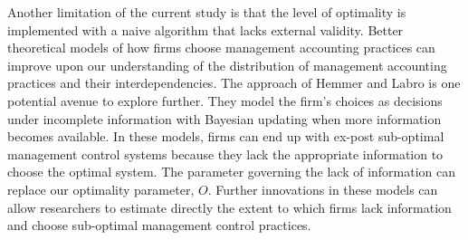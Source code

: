 \documentclass[12pt]{article}
\begin{document}
Another limitation of the current study is that the level of optimality is implemented with a naive algorithm that lacks external validity. Better theoretical models of how firms choose management accounting practices can improve upon our understanding of the distribution of management accounting practices and their interdependencies. The approach of Hemmer and Labro \citeyearpar{hemmer_management_2019} is one potential avenue to explore further. They model the firm's choices as decisions under incomplete information with Bayesian updating when more information becomes available. In these models, firms can end up with ex-post sub-optimal management control systems because they lack the appropriate information to choose the optimal system. The parameter governing the lack of information can replace our optimality parameter, \(O\). Further innovations in these models can allow researchers to estimate directly the extent to which firms lack information and choose sub-optimal management control practices.

\pagebreak
 
\appendix
\renewcommand{\theequation}{A.\arabic{equation}}
\setcounter{equation}{0}
\end{document}
